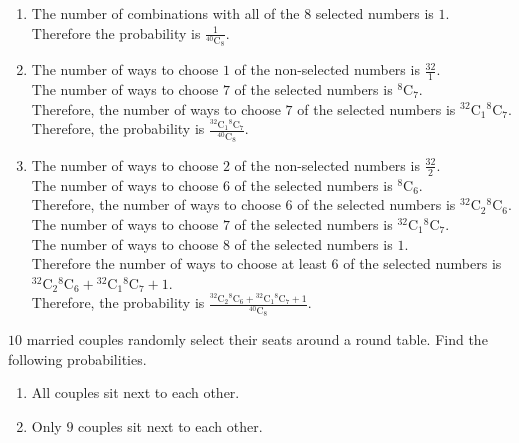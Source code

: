 \documentclass[fleqn, a4paper, 11pt, oneside]{amsart}
\theoremstyle{definition}
\theoremstyle{theorem}
\newcommand*{\comb}[2]{{}^{#1}\mathrm{C}_{#2}}%
\begin{document}
\begin{solution}
	\begin{enumerate}[leftmargin=*]
		\item
			The number of combinations with all of the $8$ selected numbers is $1$.\\
			Therefore the probability is $\frac{1}{\comb{40}{8}}$.
		\item
			The number of ways to choose $1$ of the non-selected numbers is $\frac{32}{1}$.\\
			The number of ways to choose $7$ of the selected numbers is $\comb{8}{7}$.\\
			Therefore, the number of ways to choose $7$ of the selected numbers is $\comb{32}{1} \comb{8}{7}$.\\
			Therefore, the probability is $\frac{\comb{32}{1} \comb{8}{7}}{\comb{40}{8}}$.
		\item
			The number of ways to choose $2$ of the non-selected numbers is $\frac{32}{2}$.\\
			The number of ways to choose $6$ of the selected numbers is $\comb{8}{6}$.\\
			Therefore, the number of ways to choose $6$ of the selected numbers is $\comb{32}{2} \comb{8}{6}$.\\
			The number of ways to choose $7$ of the selected numbers is $\comb{32}{1} \comb{8}{7}$.\\
			The number of ways to choose $8$ of the selected numbers is $1$.\\
			Therefore the number of ways to choose at least $6$ of the selected numbers is $\comb{32}{2} \comb{8}{6} + \comb{32}{1} \comb{8}{7} + 1$.\\
			Therefore, the probability is $\frac{\comb{32}{2} \comb{8}{6} + \comb{32}{1} \comb{8}{7} + 1}{\comb{40}{8}}$.
	\end{enumerate}
\end{solution}

\begin{question}
	$10$ married couples randomly select their seats around a round table.
	Find the following probabilities.
	\begin{enumerate}
		\item All couples sit next to each other.
		\item Only $9$ couples sit next to each other.
	\end{enumerate}
\end{question}
\end{document}
